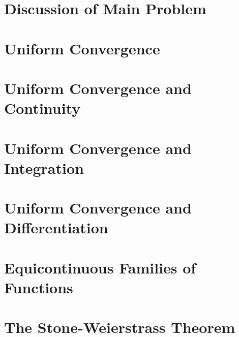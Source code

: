 
\section{Discussion of Main Problem}\label{sec:discussion-of-main-problem}


\section{Uniform Convergence}\label{sec:uniform-convergence}


\section{Uniform Convergence and Continuity}\label{sec:uniform-convergence-and-continuity}


\section{Uniform Convergence and Integration}\label{sec:uniform-convergence-and-integration}


\section{Uniform Convergence and Differentiation}\label{sec:uniform-convergence-and-differentiation}


\section{Equicontinuous Families of Functions}\label{sec:equicontinuous-families-of-functions}


\section{The Stone-Weierstrass Theorem}\label{sec:the-stone-weierstrass-theorem}

